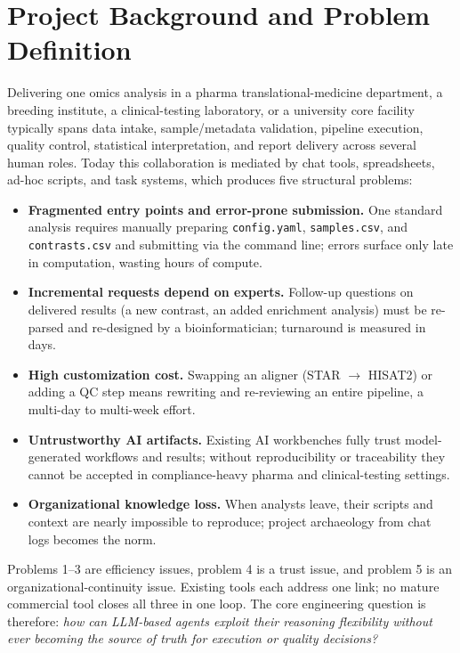 \documentclass[11pt,a4paper]{article}
\begin{document}
\section{Project Background and Problem Definition}

Delivering one omics analysis in a pharma translational-medicine department, a breeding institute, a clinical-testing laboratory, or a university core facility typically spans data intake, sample/metadata validation, pipeline execution, quality control, statistical interpretation, and report delivery across several human roles. Today this collaboration is mediated by chat tools, spreadsheets, ad-hoc scripts, and task systems, which produces five structural problems:

\begin{itemize}
  \item \textbf{Fragmented entry points and error-prone submission.} One standard analysis requires manually preparing \texttt{config.yaml}, \texttt{samples.csv}, and \texttt{contrasts.csv} and submitting via the command line; errors surface only late in computation, wasting hours of compute.
  \item \textbf{Incremental requests depend on experts.} Follow-up questions on delivered results (a new contrast, an added enrichment analysis) must be re-parsed and re-designed by a bioinformatician; turnaround is measured in days.
  \item \textbf{High customization cost.} Swapping an aligner (STAR $\rightarrow$ HISAT2) or adding a QC step means rewriting and re-reviewing an entire pipeline, a multi-day to multi-week effort.
  \item \textbf{Untrustworthy AI artifacts.} Existing AI workbenches fully trust model-generated workflows and results; without reproducibility or traceability they cannot be accepted in compliance-heavy pharma and clinical-testing settings.
  \item \textbf{Organizational knowledge loss.} When analysts leave, their scripts and context are nearly impossible to reproduce; project archaeology from chat logs becomes the norm.
\end{itemize}

Problems 1--3 are efficiency issues, problem 4 is a trust issue, and problem 5 is an organizational-continuity issue. Existing tools each address one link; no mature commercial tool closes all three in one loop. The core engineering question is therefore: \emph{how can LLM-based agents exploit their reasoning flexibility without ever becoming the source of truth for execution or quality decisions?}
\end{document}
